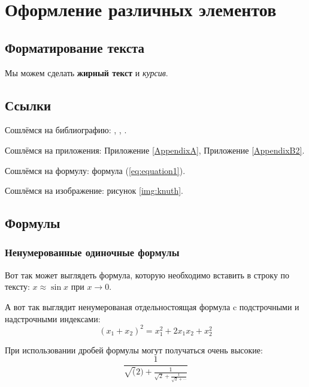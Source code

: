 \chapter{Оформление различных элементов} \label{chapt1}

\section{Форматирование текста} \label{sect1_1}

Мы можем сделать \textbf{жирный текст} и \textit{курсив}.


\section{Ссылки} \label{sect1_2}
Сошлёмся на библиографию: \cite{bib1}, \cite{bib2}, \cite{bib3,bib4,bib5}.

Сошлёмся на приложения: Приложение \ref{AppendixA}, Приложение \ref{AppendixB2}.

Сошлёмся на формулу: формула (\ref{eq:equation1}).

Сошлёмся на изображение: рисунок \ref{img:knuth}.


\section{Формулы} \label{sect1_3}

\subsection{Ненумерованные одиночные формулы} \label{subsect1_3_1}

Вот так может выглядеть формула, которую необходимо вставить в строку по тексту: $x \approx \sin x$ при $x \to 0$.

А вот так выглядит ненумерованая отдельностоящая формула c подстрочными и надстрочными индексами:
$$
(x_1+x_2)^2 = x_1^2 + 2 x_1 x_2 + x_2^2
$$

При использовании дробей формулы могут получаться очень высокие:
$$
  \frac{1}{\sqrt(2)+
  \displaystyle\frac{1}{\sqrt{2}+
  \displaystyle\frac{1}{\sqrt{2}+\cdots}}}
$$

